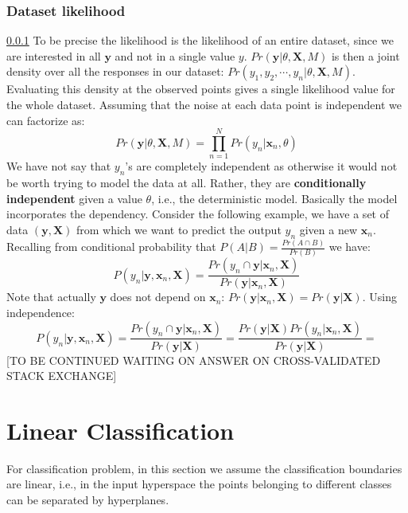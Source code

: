 \documentclass[12pt, letterpaper]{article}
\theoremstyle{definition}
\newcommand{\X}{\mathrm{\mathbf{X}}}
\newcommand{\y}{\mathbf{y}}
\newcommand{\x}{\mathbf{x}}
\begin{document}
\subsubsection{Dataset likelihood}
\label{dataset likelihood}
\ref{dataset likelihood}
To be precise the likelihood is the likelihood of an entire dataset, since we are interested in all $\y$ and not in a single value $y$. $Pr(\y|\theta,\X,M)$ is then a joint density over all the responses in our dataset: $Pr(y_1, y_2, \cdots, y_n|\theta,\X,M)$. Evaluating this density at the observed points gives a single likelihood value for the whole dataset.	 Assuming that the noise at each data point is independent we can factorize as:
\begin{equation}
Pr(\y|\theta,\X,M) = \prod_{n=1}^N Pr(y_n|\x_n, \theta)
\end{equation}
We have not say that $y_n$'s are completely independent as otherwise it would not be worth trying to model the data at all. Rather, they are \textbf{conditionally independent} given a value $\theta$, i.e., the deterministic model.
Basically the model incorporates the dependency. Consider the following example, we have a set of data $(\y,\X)$ from which we want to predict the output $y_n$ given a new $\x_n$. Recalling from conditional probability that $P(A|B) = \frac{Pr(A\cap B)}{Pr(B)}$ we have:
\begin{equation}
P(y_n|\y,\x_n, \X) = \frac{Pr(y_n\cap \y|\x_n,\X)}{Pr(\y|\x_n,\X)}
\end{equation}
Note that actually $\y$ does not depend on $\x_n$: $Pr(\y|\x_n,\X) = Pr(\y|\X)$. Using independence:
\begin{equation}
P(y_n|\y,\x_n, \X) = \frac{Pr(y_n\cap \y|\x_n,\X)}{Pr(\y|\X)} = \frac{Pr(\y|\X) Pr(y_n|\x_n,\X)}{Pr(\y|\X)} = 
\end{equation}
[TO BE CONTINUED WAITING ON ANSWER ON CROSS-VALIDATED STACK EXCHANGE]

\section{Linear Classification}
For classification problem, in this section we assume the classification boundaries are linear, i.e., in the input hyperspace the points belonging to different classes can be separated by hyperplanes. 
\end{document}
